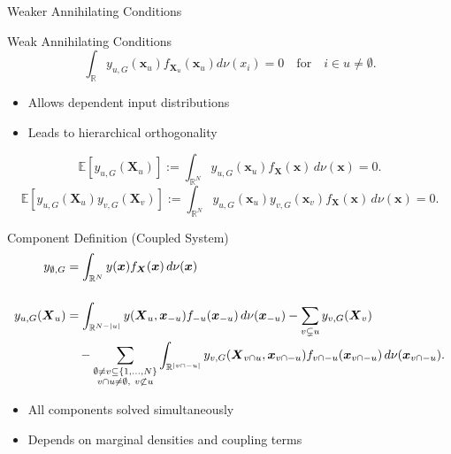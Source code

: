 \begin{frame}{Weaker Annihilating Conditions}
  \begin{block}{Weak Annihilating Conditions}
    \[
      \int_{\mathbb{R}} y_{u, G}(\boldsymbol{x}_u) f_{\boldsymbol{X}_u}(\boldsymbol{x}_u) d\nu (x_i) = 0 \quad \text{for} \quad i \in u \neq \emptyset.
    \]
  \end{block}
  \begin{itemize}
    \item Allows dependent input distributions
    \item Leads to hierarchical orthogonality
  \end{itemize}
    \[
  \mathbb{E}[y_{u, G}(\boldsymbol{X}_u)] := \int_{\mathbb{R}^N} y_{u, G}(\boldsymbol{x}_u) f_{\boldsymbol{X}}(\boldsymbol{x}) \, d\nu (\boldsymbol{x}) = 0.
  \]
  \[
  \mathbb{E}[y_{u, G}(\boldsymbol{X}_u)y_{v, G}(\boldsymbol{X}_v)] := \int_{\mathbb{R}^N} y_{u, G}(\boldsymbol{x}_u) y_{v, G}(\boldsymbol{x}_v) f_{\boldsymbol{X}}(\boldsymbol{x}) \, d\nu (\boldsymbol{x}) = 0.
  \]
\end{frame}


\begin{frame}{Component Definition (Coupled System)}
  \begin{align}
    y_{\emptyset,G} &= \int_{\mathbb{R}^N} y(\boldsymbol{x}) f_{\boldsymbol{X}}(\boldsymbol{x}) \, d \nu(\boldsymbol{x}) \\[3ex]
    y_{u,G}(\boldsymbol{X}_u) &= \int_{\mathbb{R}^{N - |u|}} y(\boldsymbol{X}_u, \boldsymbol{x}_{-u}) f_{-u}(\boldsymbol{x}_{-u}) \, d \nu(\boldsymbol{x}_{-u}) - \sum_{v \subsetneq u} y_{v,G}(\boldsymbol{X}_v) \notag \\
    &\quad - \sum_{\substack{\emptyset \ne v \subseteq \{1,\dots,N\} \\ v \cap u \ne \emptyset,\ v \not\subset u}} \int_{\mathbb{R}^{|v \cap -u|}} y_{v,G}(\boldsymbol{X}_{v \cap u}, \boldsymbol{x}_{v \cap -u}) f_{v \cap -u}(\boldsymbol{x}_{v \cap -u}) \, d \nu(\boldsymbol{x}_{v \cap -u}).
\end{align}
  \begin{itemize}
    \item All components solved simultaneously
    \item Depends on marginal densities and coupling terms
  \end{itemize}
\end{frame}

